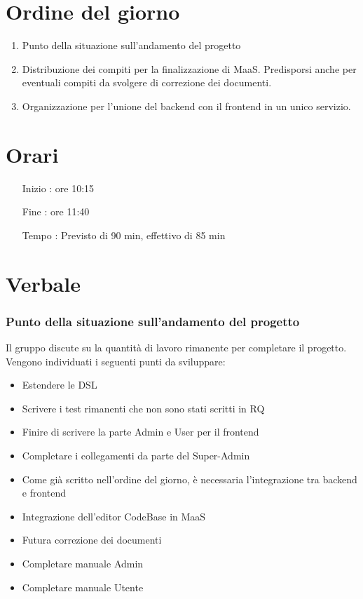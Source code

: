 \documentclass[11pt]{meetingmins}
\begin{document}
\maketitle

\section{Ordine del giorno}

\begin{enumerate}

\item Punto della situazione sull'andamento del progetto
\item Distribuzione dei compiti per la finalizzazione di MaaS. Predisporsi anche per eventuali compiti da svolgere di correzione dei documenti.
\item Organizzazione per l'unione del backend con il frontend in un unico servizio.

\end{enumerate}

\section{Orari}

\begin{itemize}
\item[Inizio]: ore 10:15
\item[Fine]: ore 11:40
\item[Tempo]: Previsto di 90 min, effettivo di 85 min

\end{itemize}

\section{Verbale}

\subsubsection{Punto della situazione sull'andamento del progetto}

Il gruppo discute su la quantità di lavoro rimanente per completare il progetto. Vengono individuati i seguenti punti da sviluppare:
\begin{itemize}

\item Estendere le DSL
\item Scrivere i test rimanenti che non sono stati scritti in RQ
\item Finire di scrivere la parte Admin e User per il frontend
\item Completare i collegamenti da parte del Super-Admin
\item Come già scritto nell'ordine del giorno, è necessaria l'integrazione tra backend e frontend
\item Integrazione dell'editor CodeBase in MaaS
\item Futura correzione dei documenti
\item Completare manuale Admin
\item Completare manuale Utente
\end{itemize}
\end{document}
